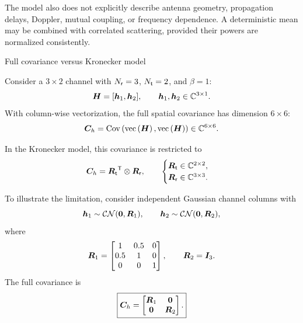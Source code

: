 The model also does not explicitly describe
antenna geometry, propagation delays,
Doppler, mutual coupling, or frequency dependence.
A deterministic mean may be combined with
correlated scattering, provided their powers
are normalized consistently.


\begin{example}{Full covariance versus Kronecker model}
	
	Consider a $3\times2$ channel with
	$N_{\mathsf{r}}=3$, $N_{\mathsf{t}}=2$, and $\beta=1$:
	\begin{equation*}
		\bm{H}=[\bm{h}_1,\bm{h}_2],
		\qquad
		\bm{h}_1,\bm{h}_2\in\mathbb{C}^{3\times1}.
	\end{equation*}
	With column-wise vectorization, the full spatial
	covariance has dimension $6\times6$:
	\begin{equation*}
		\bm{C}_h
		=\operatorname{Cov}\left(\operatorname{vec}\left(\bm{H}\right),\operatorname{vec}\left(\bm{H}\right)\right)
		\in\mathbb{C}^{6\times6}.
	\end{equation*}
	
	In the Kronecker model, this covariance is restricted to
	\begin{equation*}
		\bm{C}_h
		={\bm{R}_{\mathsf t}}^{\mathsf{T}}\otimes \bm{R}_{\mathsf r},
		\qquad
		\begin{cases}
			\bm{R}_{\mathsf t}\in\mathbb{C}^{2\times2},\\
			\bm{R}_{\mathsf r}\in\mathbb{C}^{3\times3}.
		\end{cases}
	\end{equation*}
	
	To illustrate the limitation, consider independent
	Gaussian channel columns with
	\begin{equation*}
		\bm{h}_1\sim\mathcal{CN}(\bm{0},\bm{R}_1),
		\qquad
		\bm{h}_2\sim\mathcal{CN}(\bm{0},\bm{R}_2),
	\end{equation*}
	where
	\begin{equation*}
		\bm{R}_1=
		\begin{bmatrix}
			1&0.5&0\\
			0.5&1&0\\
			0&0&1
		\end{bmatrix},
		\qquad
		\bm{R}_2=\bm{I}_3.
	\end{equation*}
	The full covariance is
	\begin{equation*}
		\boxed{
			\bm{C}_h=
			\begin{bmatrix}
				\bm{R}_1&\bm{0}\\
				\bm{0}&\bm{R}_2
			\end{bmatrix}.
		}
	\end{equation*}
	

\end{example}
